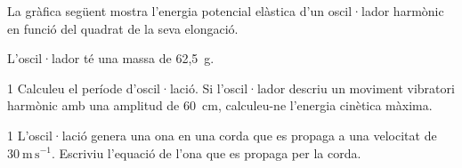 La gràfica següent mostra l'energia potencial elàstica d'un oscil·lador harmònic en funció del quadrat de la seva elongació.


L'oscil·lador té una massa de 62,5~g.

\begin{apartat}{1}
Calculeu el període d'oscil·lació. Si l'oscil·lador descriu un moviment vibratori harmònic amb una amplitud de 60~cm, calculeu-ne l'energia cinètica màxima.
\end{apartat}

\begin{apartat}{1}
L'oscil·lació genera una ona en una corda que es propaga a una velocitat de $30\ \mathrm{m\,s^{-1}}$. Escriviu l'equació de l'ona que es propaga per la corda.
\end{apartat}
